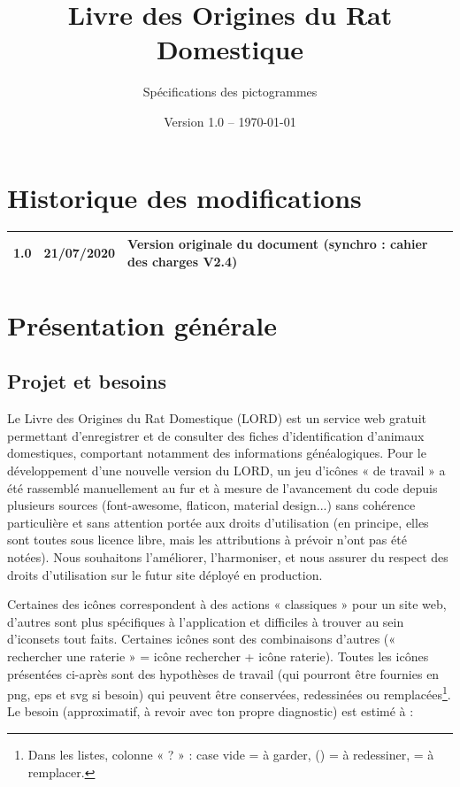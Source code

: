 \documentclass[a4paper,10pt]{article}
\title{Livre des Origines du Rat Domestique}
\author{Spécifications des pictogrammes}
\date{Version 1.0 -- \today}
\begin{document}
\maketitle

\section*{Historique des modifications}

\large
\noindent\begin{tabularx}{\textwidth}{|l|l|X|}\hline
\textbf{1.0} & \textbf{21/07/2020} & Version originale du document (synchro : cahier des charges V2.4)\\\hline
\end{tabularx}
\normalsize

\tableofcontents

\setlength{\parskip}{10pt}
\section{Présentation générale}

\subsection{Projet et besoins}
Le Livre des Origines du Rat Domestique (LORD) est un service web gratuit permettant d'enregistrer et de consulter des fiches d'identification d'animaux domestiques, comportant notamment des informations généalogiques. Pour le développement d'une nouvelle version du LORD, un jeu d'icônes « de travail » a été rassemblé manuellement au fur et à mesure de l'avancement du code depuis plusieurs sources (font-awesome, flaticon, material design...) sans cohérence particulière et sans attention portée aux droits d'utilisation (en principe, elles sont toutes sous licence libre, mais les attributions à prévoir n'ont pas été notées). Nous souhaitons l'améliorer, l'harmoniser, et nous assurer du respect des droits d'utilisation sur le futur site déployé en production.

Certaines des icônes correspondent à des actions « classiques » pour un site web, d'autres sont plus spécifiques à l'application et difficiles à trouver au sein d'iconsets tout faits. Certaines icônes sont des combinaisons d'autres (« rechercher une raterie » = icône rechercher + icône raterie). Toutes les icônes présentées ci-après sont des hypothèses de travail (qui pourront être fournies en png, eps et svg si besoin) qui peuvent être conservées, redessinées ou remplacées\footnote{Dans les listes, colonne « ? » : case vide = à garder, (\texttimes) = à redessiner, \texttimes = à remplacer.}. Le besoin (approximatif, à revoir avec ton propre diagnostic) est estimé à :
\end{document}
